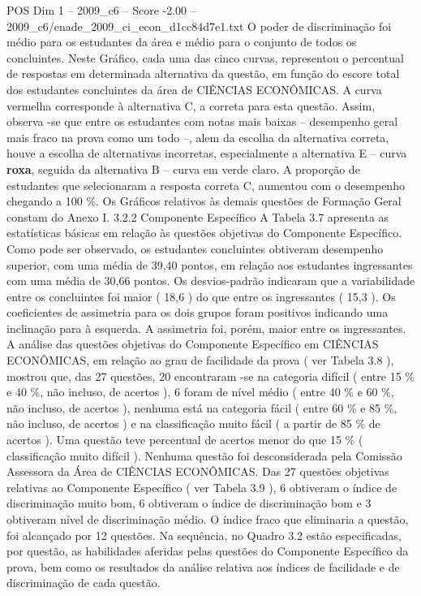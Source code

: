 \begin{textsample}{POS Dim 1 – 2009\_c6 – Score -2.00 – 2009\_c6/enade\_2009\_ci\_econ\_d1cc84d7e1.txt}
O poder de discriminação foi médio para os estudantes da área e médio para o conjunto de todos os concluintes.
Neste Gráfico, cada uma das cinco curvas, representou o percentual de respostas em determinada alternativa da questão, em função do escore total dos estudantes concluintes da área de CIÊNCIAS ECONÔMICAS.
A curva vermelha corresponde à alternativa C, a correta para esta questão.
Assim, observa -se que entre os estudantes com notas mais baixas – desempenho geral mais fraco na prova como um todo –, alem da escolha da alternativa correta, houve a escolha de alternativas incorretas, especialmente a alternativa E – curva \textbf{roxa}, seguida da alternativa B – curva em verde claro.
A proporção de estudantes que selecionaram a resposta correta C, aumentou com o desempenho chegando a 100 \%.
Os Gráficos relativos às demais questões de Formação Geral constam do Anexo I. 3.2.2 Componente Específico A Tabela 3.7 apresenta as estatísticas básicas em relação às questões objetivas do Componente Específico.
Como pode ser observado, os estudantes concluintes obtiveram desempenho superior, com uma média de 39,40 pontos, em relação aos estudantes ingressantes com uma média de 30,66 pontos.
Os desvios-padrão indicaram que a variabilidade entre os concluintes foi maior ( 18,6 ) do que entre os ingressantes ( 15,3 ).
Os coeficientes de assimetria para os dois grupos foram positivos indicando uma inclinação para à esquerda.
A assimetria foi, porém, maior entre os ingressantes.
A análise das questões objetivas do Componente Específico em CIÊNCIAS ECONÔMICAS, em relação ao grau de facilidade da prova ( ver Tabela 3.8 ), mostrou que, das 27 questões, 20 encontraram -se na categoria difícil ( entre 15 \% e 40 \%, não incluso, de acertos ), 6 foram de nível médio ( entre 40 \% e 60 \%, não incluso, de acertos ), nenhuma está na categoria fácil ( entre 60 \% e 85 \%, não incluso, de acertos ) e na classificação muito fácil ( a partir de 85 \% de acertos ).
Uma questão teve percentual de acertos menor do que 15 \% ( classificação muito difícil ).
Nenhuma questão foi desconsiderada pela Comissão Assessora da Área de CIÊNCIAS ECONÔMICAS.
Das 27 questões objetivas relativas ao Componente Específico ( ver Tabela 3.9 ), 6 obtiveram o índice de discriminação muito bom, 6 obtiveram o índice de discriminação bom e 3 obtiveram nível de discriminação médio.
O índice fraco que eliminaria a questão, foi alcançado por 12 questões.
Na sequência, no Quadro 3.2 estão especificadas, por questão, as habilidades aferidas pelas questões do Componente Específico da prova, bem como os resultados da análise relativa aos índices de facilidade e de discriminação de cada questão.

\end{textsample}
